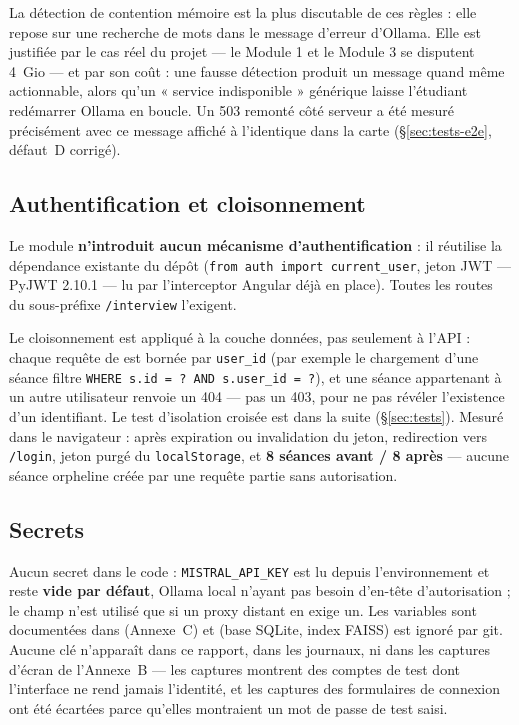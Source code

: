 La détection de contention mémoire est la plus discutable de ces règles : elle
repose sur une recherche de mots dans le message d'erreur d'Ollama. Elle est
justifiée par le cas réel du projet --- le Module 1 et le Module 3 se disputent
4~Gio --- et par son coût : une fausse détection produit un message quand même
actionnable, alors qu'un « service indisponible » générique laisse l'étudiant
redémarrer Ollama en boucle. Un 503 remonté côté serveur a été mesuré
précisément avec ce message affiché à l'identique dans la carte (§\ref{sec:tests-e2e},
défaut~D corrigé).

\subsection{Authentification et cloisonnement}
\label{sec:sec-auth}

Le module \textbf{n'introduit aucun mécanisme d'authentification} : il réutilise
la dépendance existante du dépôt (\texttt{from auth import current\_user},
jeton JWT --- PyJWT 2.10.1 --- lu par l'interceptor Angular déjà en place).
Toutes les routes du sous-préfixe \texttt{/interview} l'exigent.

Le cloisonnement est appliqué à la couche données, pas seulement à l'API :
chaque requête de  est bornée par \texttt{user\_id} (par
exemple le chargement d'une séance filtre \texttt{WHERE s.id = ? AND
s.user\_id = ?}), et une séance appartenant à un autre utilisateur renvoie un
404 --- pas un 403, pour ne pas révéler l'existence d'un identifiant.
Le test d'isolation croisée est dans la suite (§\ref{sec:tests}). Mesuré dans
le navigateur : après expiration ou invalidation du jeton, redirection vers
\texttt{/login}, jeton purgé du \texttt{localStorage}, et \textbf{8 séances avant
/ 8 après} --- aucune séance orpheline créée par une requête partie sans
autorisation.

\subsection{Secrets}
\label{sec:sec-secrets}

Aucun secret dans le code : \texttt{MISTRAL\_API\_KEY} est lu depuis
l'environnement et reste \textbf{vide par défaut}, Ollama local n'ayant pas
besoin d'en-tête d'autorisation ; le champ n'est utilisé que si un proxy distant
en exige un. Les variables sont documentées dans 
(Annexe~C) et  (base SQLite, index FAISS) est ignoré par git.
Aucune clé n'apparaît dans ce rapport, dans les journaux, ni dans les captures
d'écran de l'Annexe~B --- les captures montrent des comptes de test
dont l'interface ne rend jamais l'identité, et les captures des formulaires de
connexion ont été écartées parce qu'elles montraient un mot de passe de test
saisi.

